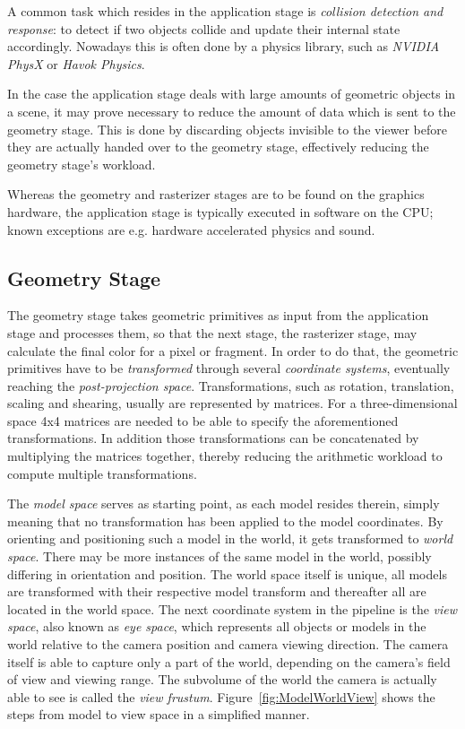 A common task which resides in the application stage is \textit{collision
detection and response}: to detect if two objects collide and update their
internal state accordingly. Nowadays this is often done by a physics library,
such as \textit{NVIDIA PhysX}\cite{misc:ageia-physx} or \textit{Havok
Physics}\cite{misc:havok}.

In the case the application stage deals with large amounts of geometric
objects in a scene, it may prove necessary to reduce the amount of data which
is sent to the geometry stage. This is done by discarding objects invisible to
the viewer before they are actually handed over to the geometry stage,
effectively reducing the geometry stage's workload.

Whereas the geometry and rasterizer stages are to be found on the graphics
hardware, the application stage is typically executed in software on the CPU;
known exceptions are e.g. hardware accelerated physics and sound.

\subsection{Geometry Stage}
The geometry stage takes geometric primitives as input from the application
stage and processes them, so that the next stage, the rasterizer stage, may
calculate the final color for a pixel or fragment. In order to do that, the
geometric primitives have to be \textit{transformed} through several
\textit{coordinate systems}, eventually reaching the \textit{post-projection
space}. Transformations, such as rotation, translation, scaling and shearing,
usually are represented by matrices. For a three-dimensional space 4x4 matrices
are needed to be able to specify the aforementioned transformations. In
addition those transformations can be concatenated by multiplying the matrices
together, thereby reducing the arithmetic workload to compute multiple
transformations.

The \textit{model space} serves as starting point, as each model resides
therein, simply meaning that no transformation has been applied to the model
coordinates. By orienting and positioning such a model in the world, it gets
transformed to \textit{world space}. There may be more instances of the same
model in the world, possibly differing in orientation and position. The world
space itself is unique, all models are transformed with their respective model
transform and thereafter all are located in the world space. The next
coordinate system in the pipeline is the \textit{view space}, also known as
\textit{eye space}, which represents all objects or models in the world relative
to the camera position and camera viewing direction. The camera itself is able
to capture only a part of the world, depending on the camera's field of view
and viewing range. The subvolume of the world the camera is actually able to see
is called the \textit{view frustum}. Figure~\ref{fig:ModelWorldView} shows the
steps from model to view space in a simplified manner.

